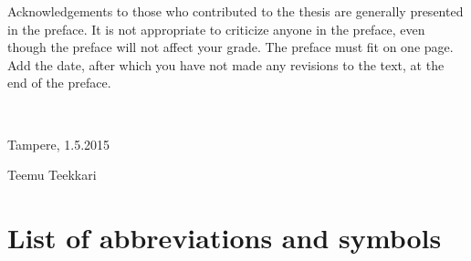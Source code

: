 \documentclass[12pt,a4paper,english]{tutthesis}
\begin{document}
\begin{otherlanguage}{english}
Acknowledgements to those who contributed to the thesis are generally
presented in the preface. It is not appropriate to criticize anyone in
the preface, even though the preface will not affect your grade. The
preface must fit on one page. Add the date, after which you have not
made any revisions to the text, at the end of the preface.

~ 

Tampere, 1.5.2015
~


Teemu Teekkari
%
%

\renewcommand\contentsname{Table of Contents} %
\setcounter{tocdepth}{3}                      %

\tableofcontents                              %

\renewcommand\listfigurename{List of Figures}  %
\listoffigures                                 %
\markboth{}{}                                  %

\renewcommand\listtablename{List of Tables}    %
\listoftables                                  %
\markboth{}{}                                  %


\lstlistoflistings                                %


%
%

\chapter*{List of abbreviations and symbols}
\markboth{}{}                                %


\end{otherlanguage}
\end{document}
